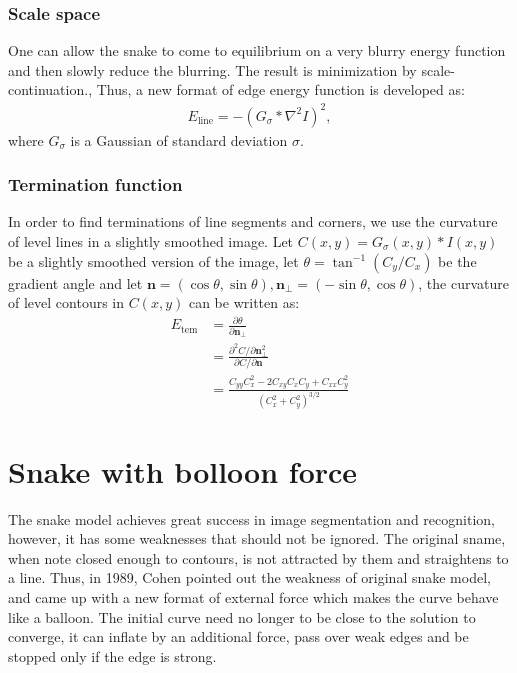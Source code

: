 \documentclass[journal]{IEEEtran}
\begin{document}
\subsubsection{Scale space}
One can allow the snake to come to equilibrium on a very blurry energy function and then slowly reduce the blurring. The result is minimization by scale-continuation.\cite{s20},\cite{s21} Thus, a new format of edge energy function is developed as:
\begin{equation}\begin{aligned}
E_{\text{line}}=-(G_\sigma * \nabla^2I)^2,
\end{aligned}\end{equation}
where $G_\sigma$ is a Gaussian of standard deviation $\sigma$.
\subsubsection{Termination function}
In order to find terminations of line segments and corners, we use the curvature of level lines in a slightly smoothed image. Let $C(x,y)=G_\sigma(x,y)*I(x,y)$ be a slightly smoothed version of the image, let $\theta=\tan^{-1}{(C_y/C_x)}$ be the gradient angle and let $\mathbf{n}=(\cos \theta,\sin\theta),\mathbf{n}_\perp=(-\sin\theta,\cos\theta)$, the curvature of level contours in $C(x,y)$ can be written as:
\begin{equation}\begin{aligned}
    E_{\mathrm{tem}} &=\frac{\partial \theta}{\partial \mathbf{n}_{\perp}} \\
    &=\frac{\partial^{2} C / \partial \mathbf{n}_{\perp}^{2}}{\partial C / \partial \mathbf{n}} \\
    &=\frac{C_{y y} C_{x}^{2}-2 C_{x y} C_{x} C_{y}+C_{x x} C_{y}^{2}}{\left(C_{x}^{2}+C_{y}^{2}\right)^{3 / 2}}
\end{aligned}\end{equation}

\section{Snake with bolloon force}
The snake model achieves great success in image segmentation and recognition, however, it has some weaknesses that should not be ignored. The original sname, when note closed enough to contours, is not attracted by them and straightens to a line. Thus, in 1989, Cohen\cite{balloon} pointed out the weakness of original snake model, and came up with a new format of external force which makes the curve behave like a balloon. The initial curve need no longer to be close to the solution to converge, it can inflate by an additional force, pass over weak edges and be stopped only if the edge is strong.
\end{document}
